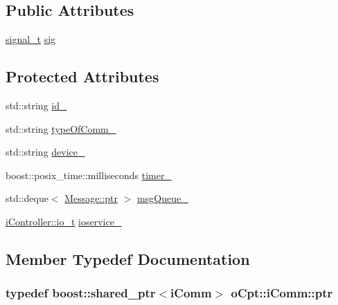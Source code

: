 \subsection*{Public Attributes}
\begin{DoxyCompactItemize}
\item 
\hyperlink{classo_cpt_1_1i_comm_a53ead13a50cbf583520f670dcd158e59}{signal\+\_\+t} \hyperlink{classo_cpt_1_1i_comm_aedc63b07be3c9a395638b782a634eecf}{sig}
\end{DoxyCompactItemize}
\subsection*{Protected Attributes}
\begin{DoxyCompactItemize}
\item 
std\+::string \hyperlink{classo_cpt_1_1i_comm_a65678a6bfb2da392d2932b0cd5d818c6}{id\+\_\+}
\item 
std\+::string \hyperlink{classo_cpt_1_1i_comm_a4805d3c40171aa763f029ebe1886e24f}{type\+Of\+Comm\+\_\+}
\item 
std\+::string \hyperlink{classo_cpt_1_1i_comm_a26b537ee10eb14c0a15bb2ad4c4b7cda}{device\+\_\+}
\item 
boost\+::posix\+\_\+time\+::milliseconds \hyperlink{classo_cpt_1_1i_comm_a1e9989bd934719256f4b50123825c00e}{timer\+\_\+}
\item 
std\+::deque$<$ \hyperlink{structo_cpt_1_1i_comm_1_1_message_ad2ba828ad76f96a30e3898b2609a4c01}{Message\+::ptr} $>$ \hyperlink{classo_cpt_1_1i_comm_aa4bc236cd4492ea8b4fd2481de58b43f}{msg\+Queue\+\_\+}
\item 
\hyperlink{classo_cpt_1_1i_controller_a51c3436b03060209f6cd2ddce6df2d0c}{i\+Controller\+::io\+\_\+t} \hyperlink{classo_cpt_1_1i_comm_a40e1c5e7d35a83973c1b913da9143a2f}{ioservice\+\_\+}
\end{DoxyCompactItemize}


\subsection{Member Typedef Documentation}
\subsubsection[{\texorpdfstring{ptr}{ptr}}]{\setlength{\rightskip}{0pt plus 5cm}typedef boost\+::shared\+\_\+ptr$<${\bf i\+Comm}$>$ {\bf o\+Cpt\+::i\+Comm\+::ptr}}\hypertarget{classo_cpt_1_1i_comm_af0c655f143251b7d03fcd98f89637228}{}\label{classo_cpt_1_1i_comm_af0c655f143251b7d03fcd98f89637228}
